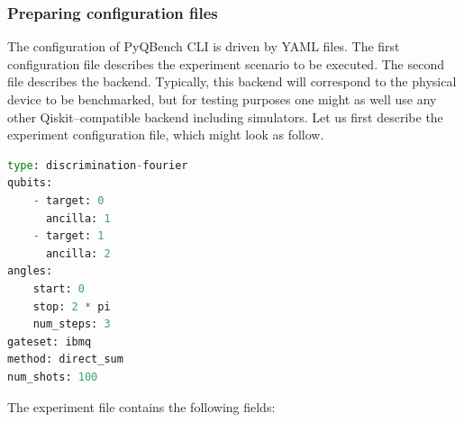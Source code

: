 \documentclass[preprint,12pt, a4paper, dvipsnames]{elsarticle}
\newcommand{\1}{{\rm 1\hspace{-0.9mm}l}}
\theoremstyle{definition}
\begin{document}
\subsubsection{Preparing configuration files}
The configuration of PyQBench CLI is driven by YAML files. The first configuration file
describes the experiment scenario to be executed. The second file describes the backend.
Typically, this backend will correspond to the physical device to be benchmarked, but for testing
purposes one might as well use any other Qiskit--compatible backend including simulators.
Let us first describe the experiment configuration file, which might look as follow.
\begin{lstlisting}[language=Python, caption=Defining the experiment, label=lst:experiment]
type: discrimination-fourier
qubits:
	- target: 0
	  ancilla: 1
	- target: 1
      ancilla: 2
angles:
	start: 0
	stop: 2 * pi
	num_steps: 3
gateset: ibmq
method: direct_sum
num_shots: 100
\end{lstlisting}
The experiment file contains the following fields:
\end{document}
